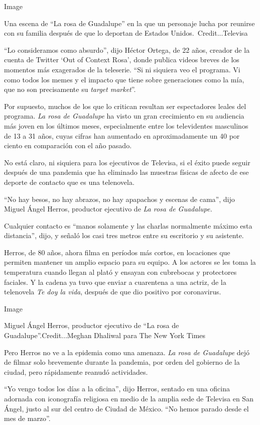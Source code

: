 Image

Una escena de ``La rosa de Guadalupe'' en la que un personaje lucha por
reunirse con su familia después de que lo deportan de Estados
Unidos.~Credit...Televisa

``Lo consideramos como absurdo'', dijo Héctor Ortega, de 22 años,
creador de la cuenta de Twitter `Out of Context Rosa', donde publica
videos breves de los momentos más exagerados de la teleserie. ``Si ni
siquiera veo el programa. Vi como todos los memes y el impacto que tiene
sobre generaciones como la mía, que no son precisamente su \emph{target
market}''.

Por supuesto, muchos de los que lo critican resultan ser espectadores
leales del programa. \emph{La rosa de Guadalupe} ha visto un gran
crecimiento en su audiencia más joven en los últimos meses,
especialmente entre los televidentes masculinos de 13 a 31 años, cuyas
cifras han aumentado en aproximadamente un 40 por ciento en comparación
con el año pasado.

No está claro, ni siquiera para los ejecutivos de Televisa, si el éxito
puede seguir después de una pandemia que ha eliminado las muestras
físicas de afecto de ese deporte de contacto que es una telenovela.

``No hay besos, no hay abrazos, no hay apapachos y escenas de cama'',
dijo Miguel Ángel Herros, productor ejecutivo de \emph{La rosa de
Guadalupe.}

Cualquier contacto es ``manos solamente y las charlas normalmente máximo
esta distancia'', dijo, y señaló los casi tres metros entre su
escritorio y su asistente.

Herros, de 80 años, ahora filma en períodos más cortos, en locaciones
que permiten mantener un amplio espacio para su equipo. A los actores se
les toma la temperatura cuando llegan al plató y ensayan con cubrebocas
y protectores faciales. Y la cadena ya tuvo que enviar a cuarentena a
una actriz, de la telenovela \emph{Te doy la vida}, después de que dio
positivo por coronavirus.

Image

Miguel Ángel Herros, productor ejecutivo de ``La rosa de
Guadalupe''.Credit...Meghan Dhaliwal para The New York Times

Pero Herros no ve a la epidemia como una amenaza. \emph{La rosa de
Guadalupe} dejó de filmar solo brevemente durante la pandemia, por orden
del gobierno de la ciudad, pero rápidamente reanudó actividades.

``Yo vengo todos los días a la oficina'', dijo Herros, sentado en una
oficina adornada con iconografía religiosa en medio de la amplia sede de
Televisa en San Ángel, justo al sur del centro de Ciudad de México. ``No
hemos parado desde el mes de marzo''.

